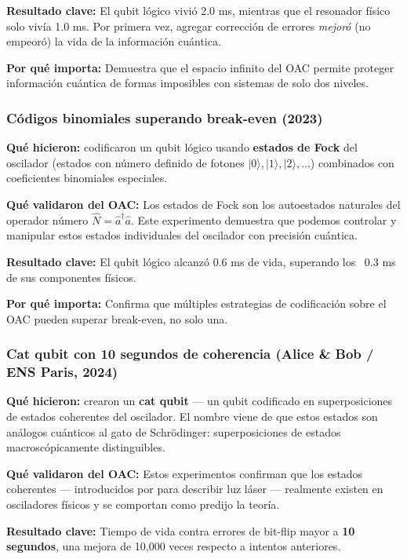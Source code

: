 \documentclass[11pt,a4paper,spanish]{book}
\begin{document}
\textbf{Resultado clave:} El qubit lógico vivió 2.0 ms, mientras que el resonador físico solo vivía 1.0 ms. Por primera vez, agregar corrección de errores \emph{mejoró} (no empeoró) la vida de la información cuántica.

\textbf{Por qué importa:} Demuestra que el espacio infinito del OAC permite proteger información cuántica de formas imposibles con sistemas de solo dos niveles.


\subsubsection{Códigos binomiales superando break-even (2023)}

\textbf{Qué hicieron:} \cite{ni2023} codificaron un qubit lógico usando \textbf{estados de Fock} del oscilador (estados con número definido de fotones $|0\rangle, |1\rangle, |2\rangle, \ldots$) combinados con coeficientes binomiales especiales.

\textbf{Qué validaron del OAC:} Los estados de Fock son los autoestados naturales del operador número $\hat{N} = \hat{a}^\dagger\hat{a}$. Este experimento demuestra que podemos controlar y manipular estos estados individuales del oscilador con precisión cuántica.

\textbf{Resultado clave:} El qubit lógico alcanzó 0.6 ms de vida, superando los ~0.3 ms de sus componentes físicos.

\textbf{Por qué importa:} Confirma que múltiples estrategias de codificación sobre el OAC pueden superar break-even, no solo una.

\subsubsection{Cat qubit con 10 segundos de coherencia (Alice \& Bob / ENS Paris, 2024)}

\textbf{Qué hicieron:} \cite{reglade2024} crearon un \textbf{cat qubit} — un qubit codificado en superposiciones de estados coherentes del oscilador. El nombre viene de que estos estados son análogos cuánticos al gato de Schrödinger: superposiciones de estados macroscópicamente distinguibles.

\textbf{Qué validaron del OAC:} Estos experimentos confirman que los estados coherentes — introducidos por \cite{glauber1963a} para describir luz láser — realmente existen en osciladores físicos y se comportan como predijo la teoría.

\textbf{Resultado clave:} Tiempo de vida contra errores de bit-flip mayor a \textbf{10 segundos}, una mejora de 10,000 veces respecto a intentos anteriores. 
\end{document}

